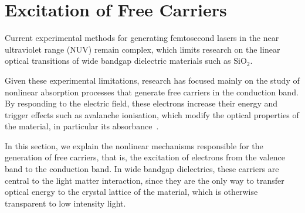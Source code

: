 \section{Excitation of Free Carriers}

Current experimental methods for generating femtosecond lasers in the near ultraviolet range (NUV) remain complex, which limits research on the linear optical transitions of wide bandgap dielectric materials such as $\mathrm{SiO}_2$.

Given these experimental limitations, research has focused mainly on the study of nonlinear absorption processes that generate free carriers in the conduction band. By responding to the electric field, these electrons increase their energy and trigger effects such as avalanche ionisation, which modify the optical properties of the material, in particular its absorbance~\cite{mao2004, bulgakova2010}.

In this section, we explain the nonlinear mechanisms responsible for the generation of free carriers, that is, the excitation of electrons from the valence band to the conduction band. In wide bandgap dielectrics, these carriers are central to the light matter interaction, since they are the only way to transfer optical energy to the crystal lattice of the material, which is otherwise transparent to low intensity light.
